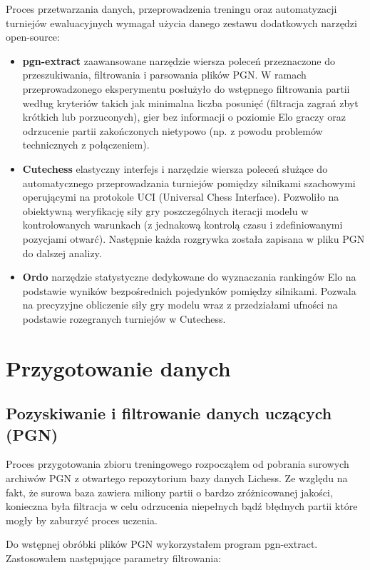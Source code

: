 \documentclass[12pt,a4paper]{report}
\begin{document}
Proces przetwarzania danych, przeprowadzenia treningu oraz automatyzacji turniejów ewaluacyjnych wymagał użycia danego zestawu dodatkowych narzędzi open-source:

\begin{itemize}
    \item \textbf{pgn-extract} zaawansowane narzędzie wiersza poleceń przeznaczone do przeszukiwania, filtrowania i parsowania plików PGN. W ramach przeprowadzonego eksperymentu posłużyło do wstępnego filtrowania partii według kryteriów takich jak minimalna liczba posunięć (filtracja zagrań zbyt krótkich lub porzuconych), gier bez informacji o poziomie Elo graczy oraz odrzucenie partii zakończonych nietypowo (np. z powodu problemów technicznych z połączeniem).
    \item \textbf{Cutechess} elastyczny interfejs i narzędzie wiersza poleceń służące do automatycznego przeprowadzania turniejów pomiędzy silnikami szachowymi operującymi na protokole UCI (Universal Chess Interface). Pozwoliło na obiektywną weryfikację siły gry poszczególnych iteracji modelu w kontrolowanych warunkach (z jednakową kontrolą czasu i zdefiniowanymi pozycjami otwarć). Następnie każda rozgrywka została zapisana w pliku PGN do dalszej analizy.
    \item \textbf{Ordo} narzędzie statystyczne dedykowane do wyznaczania rankingów Elo na podstawie wyników bezpośrednich pojedynków pomiędzy silnikami. Pozwala na precyzyjne obliczenie siły gry modelu wraz z przedziałami ufności na podstawie rozegranych turniejów w Cutechess.
\end{itemize}

\chapter{Przygotowanie danych}

\section{Pozyskiwanie i filtrowanie danych uczących (PGN)}

Proces przygotowania zbioru treningowego rozpocząłem od pobrania surowych archiwów PGN z otwartego repozytorium bazy danych Lichess. Ze względu na fakt, że surowa baza zawiera miliony partii o bardzo zróżnicowanej jakości, konieczna była filtracja w celu odrzucenia niepełnych bądź błędnych partii które mogły by zaburzyć proces uczenia.

Do wstępnej obróbki plików PGN wykorzystałem program pgn-extract. Zastosowałem następujące parametry filtrowania:
\end{document}
